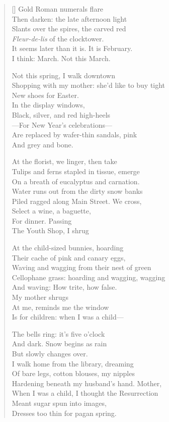 \label{ch:requiescat}
\settowidth{\versewidth}{Shopping with my mother: she'd like to buy tight}
\begin{verse}[\versewidth]
Gold Roman numerals flare\\
Then darken: the late afternoon light\\
Slants over the spires, the carved red\\
\textit{Fleur-de-lis} of the clocktower.\\
It seems later than it is. It is February.\\
I think: March. Not this March.

Not this spring, I walk downtown\\
Shopping with my mother: she'd like to buy tight\\
New shoes for Easter.\\
In the display windows,\\
Black, silver, and red high-heels\\
---For New Year's celebrations---\\
Are replaced by wafer-thin sandals, pink\\
And grey and bone.

At the florist, we linger, then take\\
Tulips and ferns stapled in tissue, emerge\\
On a breath of eucalyptus and carnation.\\
Water runs out from the dirty snow banks\\
Piled ragged along Main Street.     We cross,\\
Select a wine, a baguette,\\
For dinner.    Passing\\
The Youth Shop, I shrug

At the child-sized bunnies, hoarding\\
Their cache of pink and canary eggs,\\
Waving and wagging from their nest of green\\
Cellophane grass: hoarding and wagging, wagging\\
And waving: How trite, how false.\\
My mother shrugs\\
At me, reminds me the window\\
Is for children: when I was a child---

The bells ring: it's five o'clock\\
And dark. Snow begins as rain\\
But slowly changes over.\\
I walk home from the library, dreaming\\
Of bare legs, cotton blouses, my nipples\\
Hardening beneath my husband's hand.   Mother,\\
When I was a child, I thought the Resurrection\\
Meant sugar spun into images,\\

Dresses too thin for pagan spring.
\end{verse}
